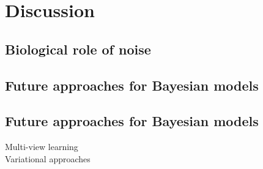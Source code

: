 
\chapter{Discussion}  

\section{Biological role of noise}

\section{Future approaches for Bayesian models}

\section{Future approaches for Bayesian models}

Multi-view learning\\
Variational approaches\\